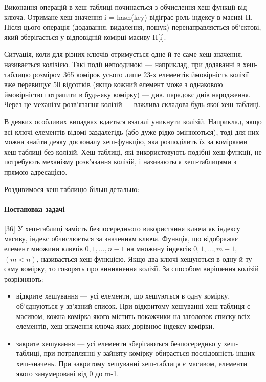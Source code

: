\documentclass[14pt]{vakthesis}
\begin{document}
Виконання операцій в хеш-таблиці починається з обчислення хеш-функції від ключа. Отримане хеш-значення i = hash(key) відіграє роль індексу в масиві H. Після цього операція (додавання, видалення, пошук) перенаправляється об'єктові, який зберігається у відповідній комірці масиву H[i].

Ситуація, коли для різних ключів отримується одне й те саме хеш-значення, називається колізією. Такі події непоодинокі — наприклад, при додаванні в хеш-таблицю розміром 365 комірок усього лише 23-х елементів ймовірність колізії вже перевищує 50 відсотків (якщо кожний елемент може з однаковою ймовірністю потрапити в будь-яку комірку)  — див. парадокс днів народження. Через це механізм розв'язання колізій — важлива складова будь-якої хеш-таблиці.

В деяких особливих випадках вдається взагалі уникнути колізій. Наприклад, якщо всі ключі елементів відомі заздалегідь (або дуже рідко змінюються), тоді для них можна знайти деяку досконалу хеш-функцію, яка розподілить їх за комірками хеш-таблиці без колізій. Хеш-таблиці, які використовують подібні хеш-функції, не потребують механізму розв'язання колізій, і називаються хеш-таблицями з прямою адресацією. 

Роздивимося хеш-таблицю більш детально: 

\paragraph{\textbf{Постановка задачі}}
[36] 
У хеш-таблиці замість безпосереднього використання ключа як індексу масиву, індекс обчислюється за значенням ключа. 
Функція, що відображає елемент множини ключів ${0, 1, ..., n-1}$ на множину індексів ${0, 1, ..., m-1}$, $(m <n)$, 
називається хеш-функцією. 
Якщо два ключі хешуються в одну й ту саму комірку, то говорять про виникнення колізії. За способом вирішення колізій розрізняють:
\begin{itemize}
\item відкрите хешування — усі елементи, що хешуються в одну комірку, об’єднуються у зв’язний список. При відкритому хешуванні хеш-таблиця є масивом, кожна комірка якого містить покажчики на заголовок списку всіх елементів, хеш-значення ключа яких дорівнює індексу комірки. 
\item закрите хешування — усі елементи зберігаються безпосередньо у хеш-таблиці, при потраплянні у зайняту комірку обирається послідовність інших хеш-значень. 
При закритому хешуванні хеш-таблиця є масивом, елементи якого занумеровані від 0 до m-1.
\end{itemize}
\end{document}
